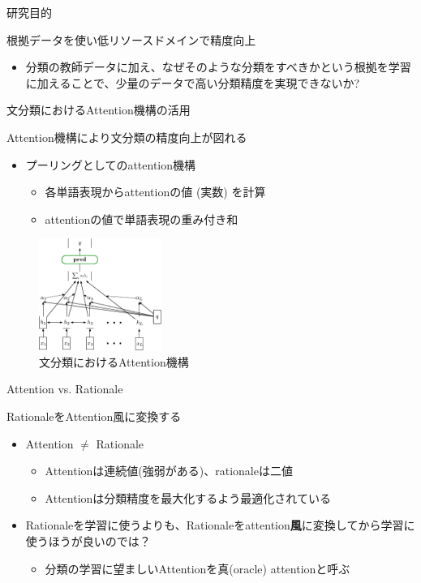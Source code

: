 \begin{frame}{研究目的}
\begin{lead}
    根拠データを使い低リソースドメインで精度向上
\end{lead}
\begin{itemize}
\item 分類の教師データに加え、なぜそのような分類をすべきかという\alert{根拠を学習に加える}ことで、\alert{少量のデータで高い分類精度}を実現できないか?
\end{itemize}
\end{frame}

\begin{frame}{文分類におけるAttention機構の活用}
\begin{lead}
    Attention機構により文分類の精度向上が図れる
\end{lead}
\begin{itemize}
\item プーリングとしてのattention機構
\begin{itemize}
    \item 各単語表現からattentionの値 (実数) を計算
    \item attentionの値で単語表現の重み付き和
\end{itemize}
\end{itemize}

\vspace*{-8pt}
\begin{figure}[H]
  \centering
  \includegraphics[width=40mm]{fig/attention_classifier.pdf}
  \caption{文分類におけるAttention機構\cite{bao_2018}}
\end{figure}
\end{frame}

\begin{frame}{Attention vs. Rationale}
\begin{lead}
    RationaleをAttention風に変換する
\end{lead}
\begin{itemize}
\item Attention $\neq$ Rationale
\begin{itemize}
    \item Attentionは連続値(強弱がある)、rationaleは二値
    \item Attentionは分類精度を最大化するよう最適化されている
\end{itemize}
\item Rationaleを学習に使うよりも、Rationaleをattention\textbf{風}に変換してから学習に使うほうが良いのでは？
\begin{itemize}
    \item 分類の学習に望ましいAttentionを\alert{真(oracle) attention}と呼ぶ
\end{itemize}
\end{itemize}
\end{frame}

